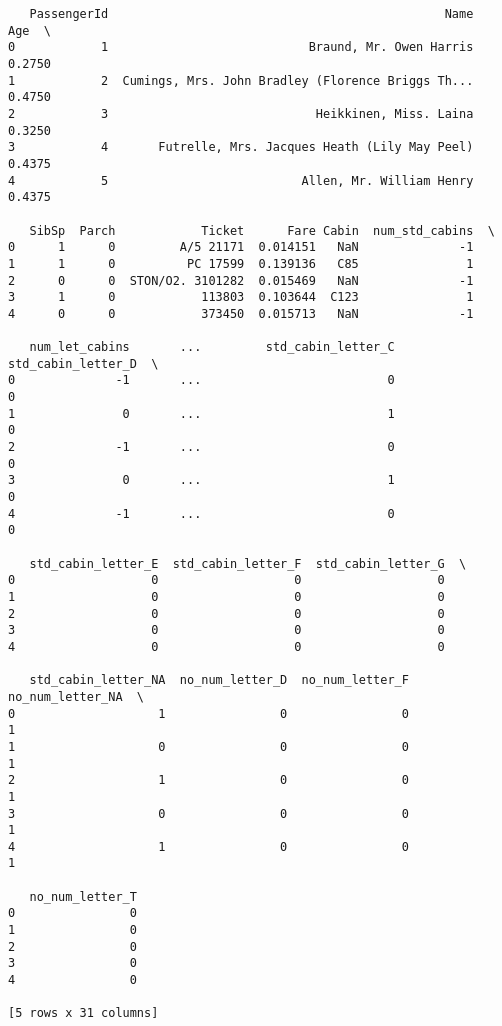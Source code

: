\documentclass[11pt]{article}
\begin{document}
    
    \begin{verbatim}
   PassengerId                                               Name     Age  \
0            1                            Braund, Mr. Owen Harris  0.2750   
1            2  Cumings, Mrs. John Bradley (Florence Briggs Th...  0.4750   
2            3                             Heikkinen, Miss. Laina  0.3250   
3            4       Futrelle, Mrs. Jacques Heath (Lily May Peel)  0.4375   
4            5                           Allen, Mr. William Henry  0.4375   

   SibSp  Parch            Ticket      Fare Cabin  num_std_cabins  \
0      1      0         A/5 21171  0.014151   NaN              -1   
1      1      0          PC 17599  0.139136   C85               1   
2      0      0  STON/O2. 3101282  0.015469   NaN              -1   
3      1      0            113803  0.103644  C123               1   
4      0      0            373450  0.015713   NaN              -1   

   num_let_cabins       ...         std_cabin_letter_C  std_cabin_letter_D  \
0              -1       ...                          0                   0   
1               0       ...                          1                   0   
2              -1       ...                          0                   0   
3               0       ...                          1                   0   
4              -1       ...                          0                   0   

   std_cabin_letter_E  std_cabin_letter_F  std_cabin_letter_G  \
0                   0                   0                   0   
1                   0                   0                   0   
2                   0                   0                   0   
3                   0                   0                   0   
4                   0                   0                   0   

   std_cabin_letter_NA  no_num_letter_D  no_num_letter_F  no_num_letter_NA  \
0                    1                0                0                 1   
1                    0                0                0                 1   
2                    1                0                0                 1   
3                    0                0                0                 1   
4                    1                0                0                 1   

   no_num_letter_T  
0                0  
1                0  
2                0  
3                0  
4                0  

[5 rows x 31 columns]
    \end{verbatim}
\end{document}
